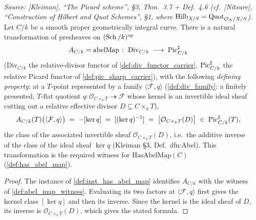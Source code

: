 \begin{lemma}\leanok
  \label{lem:line_bundle_quot_correspondence}
  \textit{Source: [Kleiman], ``The Picard scheme'', \S 3,
  Thm.~3.7 + Def.~4.6 (cf.\ [Nitsure], ``Construction of Hilbert
  and Quot Schemes'', \S 1, where \(\operatorname{Hilb}_{X/S} = \operatorname{Quot}_{\mathcal{O}_X/X/S}\)).}
  Let \(C/k\) be a smooth proper geometrically integral curve. There is a
  natural transformation of presheaves on \((\operatorname{Sch}/k)^{op}\)
  \[
    A_{C/k} = \mathrm{abelMap} \;\colon\; \mathrm{Div}_{C/k}
      \;\longrightarrow\; \operatorname{Pic}^\sharp_{C/k}
  \]
  (\(\mathrm{Div}_{C/k}\) the relative-divisor functor of
  \cref{def:div_functor_carrier}, \(\operatorname{Pic}^\sharp_{C/k}\) the relative
  Picard functor of \cref{def:pic_sharp_carrier}), with the following
  \emph{defining property}: at a \(T\)-point represented by a family
  \(\langle \mathcal F, q\rangle\) (\cref{def:div_family}: a finitely
  presented, \(T\)-flat quotient
  \(q \colon \mathcal O_{C\times_kT}\twoheadrightarrow\mathcal F\)
  whose kernel is an invertible ideal sheaf cutting out a relative effective
  divisor \(D\subseteq C\times_kT\)),
  \[
    A_{C/k}(T)\bigl(\langle \mathcal F, q\rangle\bigr)
      \;=\; -[\ker q] \;=\; [(\ker q)^{-1}]
      \;=\; \bigl[\mathcal{O}_{C \times_k T}(D)\bigr]
      \;\in\; \operatorname{Pic}^\sharp_{C/k}(T),
  \]
  the class of the associated invertible sheaf \(\mathcal{O}_{C \times_k
  T}(D)\), i.e.\ the additive inverse of the class of the ideal sheaf
  \(\ker q\) (Kleiman \S 3, Def.~dfn:Abel). This transformation is the
  required witness for \(\mathrm{HasAbelMap}(C)\)
  (\cref{def:has_abel_map}).
\end{lemma}

\begin{proof}
  The instance of \cref{def:inst_has_abel_map} identifies
  \(A_{C/k}\) with the witness of \cref{def:abel_map_witness}. Evaluating its
  two factors at \(\langle \mathcal F,q\rangle\) first gives the kernel class
  \([\ker q]\) and then its inverse. Since the kernel is the ideal sheaf of
  \(D\), its inverse is \(\mathcal O_{C\times_kT}(D)\), which gives the stated
  formula.
\end{proof}

